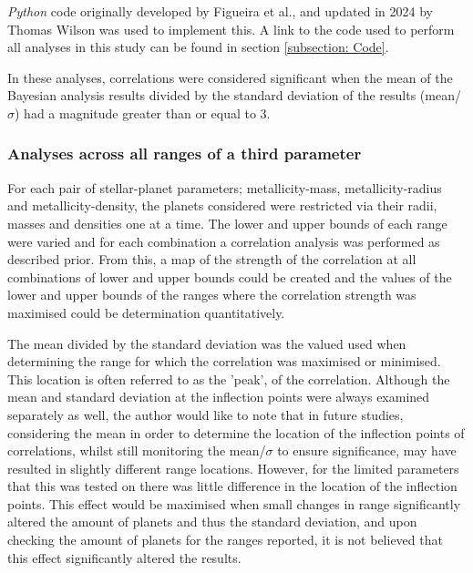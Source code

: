 \documentclass[a4paper,twocolumn,12pt]{article}
\begin{document}
\textit{Python} code originally developed by Figueira et al., and updated in 2024 by Thomas Wilson was used to implement this. A link to the code used to perform all analyses in this study can be found in section \ref{subsection: Code}.


In these analyses, correlations were considered significant when the mean of the Bayesian analysis results divided by the standard deviation of the results (mean/$\sigma$) had a magnitude greater than or equal to 3.

\vspace{2em}
\subsubsection{Analyses across all ranges of a third parameter}
\label{subsection: Ranges}
For each pair of stellar-planet parameters; metallicity-mass, metallicity-radius and metallicity-density, the planets considered were restricted via their radii, masses and densities one at a time. The lower and upper bounds of each range were varied and for each combination a correlation analysis was performed as described prior. From this, a map of the strength of the correlation at all combinations of lower and upper bounds could be created and the values of the lower and upper bounds of the ranges where the correlation strength was maximised could be determination quantitatively.  %



The mean divided by the standard deviation was the valued used when determining the range for which the correlation was maximised or minimised. This location is often referred to as the 'peak', of the correlation. Although the mean and standard deviation at the inflection points were always examined separately as well, the author would like to note that in future studies, considering the mean in order to determine the location of the inflection points of correlations, whilst still monitoring the mean/$\sigma$ to ensure significance, may have resulted in slightly different range locations. However, for the limited parameters that this was tested on there was little difference in the location of the inflection points. This effect would be maximised when small changes in range significantly altered the amount of planets and thus the standard deviation, and upon checking the amount of planets for the ranges reported, it is not believed that this effect significantly altered the results.
\end{document}
